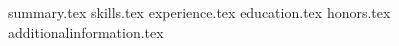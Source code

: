 \documentclass[8pt, letterpaper]{awesome-cv}
\newcommand*{\sectiondir}{resume/}
\begin{document}
\makecvheader

{summary.tex}
{skills.tex}
{experience.tex}
{education.tex}
{honors.tex}
{additionalinformation.tex}
\end{document}
